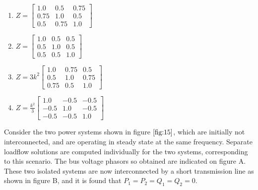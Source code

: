    \begin{multicols}{2}
    \begin{enumerate}
        \item $ Z = \begin{bmatrix} 1.0 & 0.5 & 0.75 \\ 0.75 & 1.0 & 0.5 \\ 0.5 & 0.75 & 1.0 \end{bmatrix} $
        \item $ Z = \begin{bmatrix} 1.0 & 0.5 & 0.5 \\ 0.5 & 1.0 & 0.5 \\ 0.5 & 0.5 & 1.0 \end{bmatrix} $
        \item $ Z = 3k^2 \begin{bmatrix} 1.0 & 0.75 & 0.5 \\ 0.5 & 1.0 & 0.75 \\ 0.75 & 0.5 & 1.0 \end{bmatrix} $
        \item $ Z = \frac{k^2}{3} \begin{bmatrix} 1.0 & -0.5 & -0.5 \\ -0.5 & 1.0 & -0.5 \\ -0.5 & -0.5 & 1.0 \end{bmatrix} $
    \end{enumerate}
    \end{multicols}
\bigskip
    \item Consider the two power systems shown in figure $\ref{fig:15}$, which are initially not interconnected, and are operating in steady state at the same frequency. Separate loadflow solutions are computed individually for the two systems, corresponding to this scenario. The bus voltage phasors so obtained are indicated on figure A. These two isolated systems are now interconnected by a short transmission line as shown in figure B, and it is found that $P_1 = P_2 = Q_1 = Q_2 = 0$.
